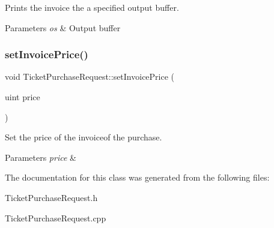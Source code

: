 Prints the invoice the a specified output buffer. 


\begin{DoxyParams}{Parameters}
{\em os} & Output buffer \\
\hline
\end{DoxyParams}
\mbox{\label{classTicketPurchaseRequest_a35b5d38bf3d6d00f90041762f2ca93ee}} 
\subsubsection{\texorpdfstring{set\+Invoice\+Price()}{setInvoicePrice()}}
{\footnotesize\ttfamily void Ticket\+Purchase\+Request\+::set\+Invoice\+Price (\begin{DoxyParamCaption}\item[{uint}]{price }\end{DoxyParamCaption})}



Set the price of the invoiceof the purchase. 


\begin{DoxyParams}{Parameters}
{\em price} & \\
\hline
\end{DoxyParams}


The documentation for this class was generated from the following files\+:\begin{DoxyCompactItemize}
\item 
Ticket\+Purchase\+Request.\+h\item 
Ticket\+Purchase\+Request.\+cpp\end{DoxyCompactItemize}
